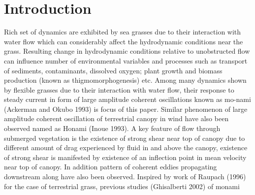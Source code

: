 \documentclass[aps,preprint,floatfix,prl]{revtex4-1}
\begin{document}
\section{Introduction}
Rich set of dynamics are exhibited by sea grasses due to their interaction with water flow which can considerably affect the hydrodynamic conditions near the 
grass. Resulting change in hydrodynamic conditions relative to unobstructed flow can influence number of environmental 
variables and processes such as transport of sediments, contaminants, dissolved oxygen;
plant growth and biomass production (known as thigmomorphogenesis) etc. 
Among many dynamics shown by flexible grasses due to their interaction with water flow, their response to steady current in form of large amplitude coherent oscillations known as
mo-nami (Ackerman and Okubo 1993) is focus of this paper. Similar phenomenon of large amplitude coherent oscillation of terrestrial canopy in wind have also been observed named as Honami 
(Inoue 1993).
\newline
A key feature of flow through submerged vegetation is the existence of strong shear near top of canopy due to
different amount of drag experienced by fluid in and above the canopy, existence of strong shear is manifested by
existence of an inflection point in mean velocity near top of canopy. In addition pattern of coherent eddies propagating downstream 
along have also been observed.
\newline
Inspired by work of Raupach (1996) for the case of terrestrial grass, previous studies (Ghisalberti 2002) of monami 
\end{document}
